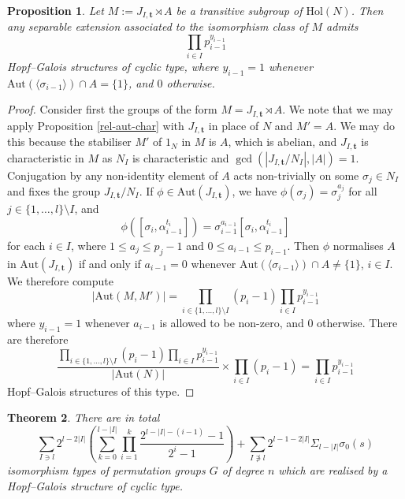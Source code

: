 \documentclass[a4paper,reqno]{amsart}
\newtheorem{theorem}{Theorem}[section]
\newtheorem{proposition}[theorem]{Proposition}
\theoremstyle{definition}
\newcommand{\bt}{\textbf{t}}
\newcommand{\Aut}{\mathrm{Aut}}
\newcommand{\Hol}{\mathrm{Hol}}
\begin{document}
\begin{proposition}\label{cyclic_HGS_Cunningham}
    Let $M:=J_{I,\bt}\rtimes A$ be a transitive subgroup of $\Hol(N)$. Then any separable extension associated to the isomorphism class of $M$ admits
    \[\prod_{i \in I}p_{i-1}^{y_{i-1}}\]
    Hopf--Galois structures of cyclic type, where $y_{i-1}=1$ whenever $\Aut(\langle \sigma_{i-1} \rangle) \cap A = \{1\}$, and $0$ otherwise.
\end{proposition}

\begin{proof}
    Consider first the groups of the form $M=J_{I,\bt}\rtimes A$. We note that we may apply Proposition \ref{rel-aut-char} with $J_{I,\bt}$ in place of $N$ and $M'=A$. We may do this because the stabiliser $M'$ of $1_N$ in $M$ is $A$, which is abelian, and $J_{I,\bt}$ is characteristic in $M$ as $N_I$ is characteristic and $\gcd(|J_{I,\bt}/N_I|,|A|)=1$. Conjugation by any non-identity element of $A$ acts non-trivially on some $\sigma_j\in N_I$ and fixes the group $J_{I,\bt}/N_I$. If $\phi \in \Aut(J_{I,\bt})$, we have $\phi(\sigma_j)=\sigma_j^{a_j}$ for all $j \in \{1,\ldots, l\}\setminus I$, and
    \[\phi\left(\left[\sigma_i,\alpha_{i-1}^{t_i}\right]\right)=\sigma_{i-1}^{a_{i-1}}\left[\sigma_i,\alpha_{i-1}^{t_i}\right]\]
    for each $i \in I$, where $1\leq a_j \leq p_j-1$ and $0\leq a_{i-1} \leq p_{i-1}$. Then $\phi$ normalises $A$ in $\Aut(J_{I,\bt})$ if and only if $a_{i-1}=0$ whenever $\Aut(\langle \sigma_{i-1} \rangle) \cap A \neq \{1\}$, $i \in I$. We therefore compute
    \[|\Aut(M,M')|=\prod_{i \in \{1,\ldots,l\}\setminus I}(p_i-1)\prod_{i \in I}p_{i-1}^{y_{i-1}}\] where $y_{i-1}=1$ whenever $a_{i-1}$ is allowed to be non-zero, and $0$ otherwise. There are therefore
    \[\frac{\prod_{i \in \{1,\ldots,l\}\setminus I}(p_i-1)\prod_{i \in I}p_{i-1}^{y_{i-1}}}{|\Aut(N)|}\times \prod_{i \in I}(p_i-1)=\prod_{i \in I}p_{i-1}^{y_{i-1}}\]
    Hopf--Galois structures of this type.
\end{proof}

\begin{theorem}\label{cyclic_cunningham_thm}
    There are in total
    \[\sum_{I \ni l}2^{l-2|I|}\left(\sum_{k=0}^{l-|I|}\prod_{i=1}^k\frac{2^{l-|I|-(i-1)}-1}{2^i-1}\right)+\sum_{I \not\ni l}2^{l-1-2|I|}\Sigma_{l-|I|}\sigma_0(s)\]
    isomorphism types of permutation groups $G$ of degree $n$ which are realised by a Hopf--Galois structure of cyclic type.
\end{theorem}
\end{document}
